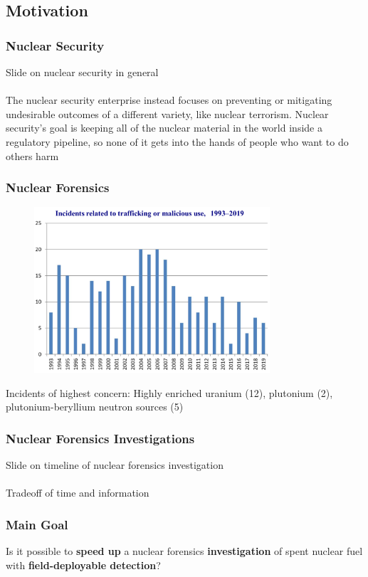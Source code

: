 \subsection{Motivation}

\begin{frame}
  \frametitle{Nuclear Security}
  Slide on nuclear security in general \\~\\ 

  The nuclear security enterprise instead focuses on preventing or mitigating
  undesirable outcomes of a different variety, like nuclear terrorism. Nuclear
  security's goal is keeping all of the nuclear material in the world inside a
  regulatory pipeline, so none of it gets into the hands of people who want to
  do others harm

\end{frame}

\begin{frame}
  \frametitle{Nuclear Forensics}
  \begin{figure}
    \centering
    \includegraphics[width=0.78\textwidth]{./figures/nucleartrafficking.png}
  \end{figure}
  Incidents of highest concern: Highly enriched uranium (12), plutonium (2), 
  plutonium-beryllium neutron sources (5) \cite{itdb}
\end{frame}

\begin{frame}
  \frametitle{Nuclear Forensics Investigations}
  Slide on timeline of nuclear forensics investigation\\~\\
  Tradeoff of time and information
\end{frame}

\begin{frame}
  \frametitle{Main Goal}

  Is it possible to \textbf{speed up} a nuclear forensics
  \textbf{investigation} of spent nuclear fuel with \textbf{field-deployable
  detection}?

\end{frame}

